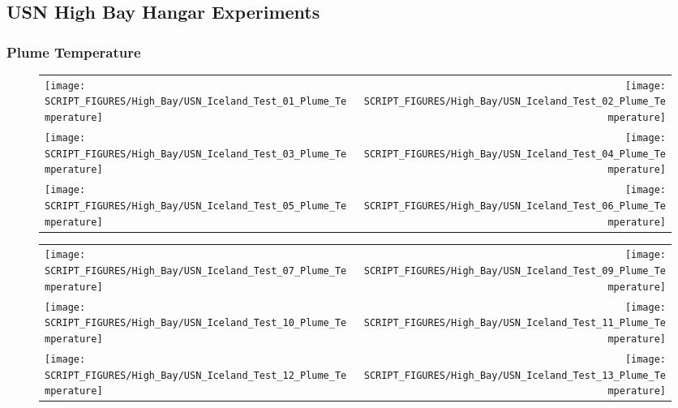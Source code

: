 \clearpage

\subsection{USN High Bay Hangar Experiments}
\label{USN_Plume}

\subsubsection{Plume Temperature}

\begin{figure}[h!]
\begin{tabular*}{\textwidth}{l@{\extracolsep{\fill}}r}
\texttt{[image: SCRIPT\_FIGURES/High\_Bay/USN\_Iceland\_Test\_01\_Plume\_Temperature]} &
\texttt{[image: SCRIPT\_FIGURES/High\_Bay/USN\_Iceland\_Test\_02\_Plume\_Temperature]} \\
\texttt{[image: SCRIPT\_FIGURES/High\_Bay/USN\_Iceland\_Test\_03\_Plume\_Temperature]} &
\texttt{[image: SCRIPT\_FIGURES/High\_Bay/USN\_Iceland\_Test\_04\_Plume\_Temperature]} \\
\texttt{[image: SCRIPT\_FIGURES/High\_Bay/USN\_Iceland\_Test\_05\_Plume\_Temperature]} &
\texttt{[image: SCRIPT\_FIGURES/High\_Bay/USN\_Iceland\_Test\_06\_Plume\_Temperature]} \\
\end{tabular*}
\label{USN_Plume_Iceland_Plume_Temperature}
\end{figure}

\begin{figure}[!ht]
\begin{tabular*}{\textwidth}{l@{\extracolsep{\fill}}r}
\texttt{[image: SCRIPT\_FIGURES/High\_Bay/USN\_Iceland\_Test\_07\_Plume\_Temperature]} &
\texttt{[image: SCRIPT\_FIGURES/High\_Bay/USN\_Iceland\_Test\_09\_Plume\_Temperature]} \\
\texttt{[image: SCRIPT\_FIGURES/High\_Bay/USN\_Iceland\_Test\_10\_Plume\_Temperature]} &
\texttt{[image: SCRIPT\_FIGURES/High\_Bay/USN\_Iceland\_Test\_11\_Plume\_Temperature]} \\
\texttt{[image: SCRIPT\_FIGURES/High\_Bay/USN\_Iceland\_Test\_12\_Plume\_Temperature]} &
\texttt{[image: SCRIPT\_FIGURES/High\_Bay/USN\_Iceland\_Test\_13\_Plume\_Temperature]} \\
\end{tabular*}
\label{USN_Plume_Iceland_2}
\end{figure}

